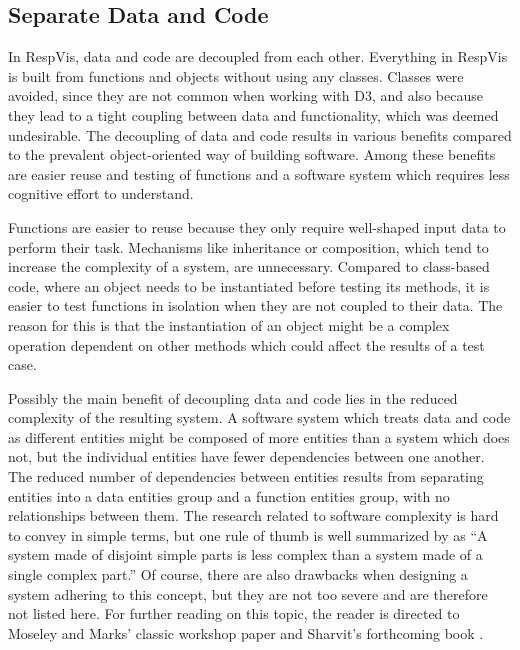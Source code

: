 \subsection{Separate Data and Code}

In RespVis, data and code are decoupled from each other. Everything in
RespVis is built from functions and objects without using any classes.
Classes were avoided, since they are not common when working with D3,
and also because they lead to a tight coupling between data and
functionality, which was deemed undesirable. The decoupling of data
and code results in various benefits compared to the prevalent
object-oriented way of building software. Among these benefits are
easier reuse and testing of functions and a software system which
requires less cognitive effort to understand.

Functions are easier to reuse because they only require well-shaped
input data to perform their task. Mechanisms like inheritance or
composition, which tend to increase the complexity of a system, are
unnecessary. Compared to class-based code, where an object needs to be
instantiated before testing its methods, it is easier to test
functions in isolation when they are not coupled to their data. The
reason for this is that the instantiation of an object might be a
complex operation dependent on other methods which could affect the
results of a test case.

Possibly the main benefit of decoupling data and code lies in the
reduced complexity of the resulting system. A software system which
treats data and code as different entities might be composed of more
entities than a system which does not, but the individual entities
have fewer dependencies between one another. The reduced number of
dependencies between entities results from separating entities into a
data entities group and a function entities group, with no
relationships between them. The research related to software
complexity is hard to convey in simple terms, but one rule of thumb is
well summarized by \textcite{DataCodeSeparation} as \enquote{A system
  made of disjoint simple parts is less complex than a system made of
  a single complex part.} Of course, there are also drawbacks when
designing a system adhering to this concept, but they are not too
severe and are therefore not listed here. For further reading on this
topic, the reader is directed to Moseley and Marks' classic workshop
paper \parencite{OutOfTarPit} and Sharvit's forthcoming book
\parencite{Sharvit-Book}.




